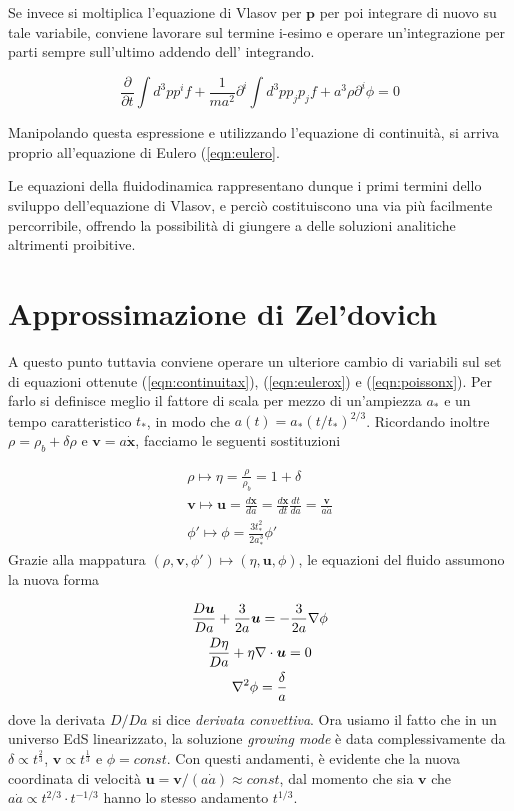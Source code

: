 Se invece si moltiplica l'equazione di Vlasov per $\bm{p}$ per poi integrare di nuovo su tale variabile, 
conviene lavorare sul termine i-esimo e operare un'integrazione per parti sempre sull'ultimo addendo dell'
integrando.

\begin{equation}
    \frac{\partial }{\partial t} \int d^3 p p^i f + \frac{1}{ma^2} \partial^i \int d^3 p p_j p_j f + a^3 \rho \partial^i \phi = 0 
\end{equation}

Manipolando questa espressione e utilizzando l'equazione di continuità, si arriva proprio all'equazione di Eulero
(\ref{eqn:eulero}.

Le equazioni della fluidodinamica rappresentano dunque i primi termini dello sviluppo dell'equazione di Vlasov,
e perciò costituiscono una via più facilmente percorribile, offrendo la possibilità di giungere a delle soluzioni
analitiche altrimenti proibitive.


\section{Approssimazione di Zel'dovich}

A questo punto tuttavia conviene operare un ulteriore cambio di variabili sul set di equazioni ottenute (\ref{eqn:continuitax}),
(\ref{eqn:eulerox}) e (\ref{eqn:poissonx}). Per farlo si definisce meglio il fattore di scala per mezzo di un'ampiezza $a_{*}$ e
un tempo caratteristico $t_{*}$, in modo che $a(t) = a_{*}(t / t_{*})^{2/3}$. Ricordando inoltre $\rho = \rho_b + \delta\rho$ e 
$\bm{v} = a \dot{\bm{x}}$, facciamo le seguenti sostituzioni

\begin{gather}
    \rho \mapsto \eta = \frac{\rho}{\rho_b} = 1 + \delta \\
    \bm{v} \mapsto \bm{u} = \frac{d\bm{x}}{da} = \frac{d\bm{x}}{dt}\frac{dt}{da} = \frac{\bm{v}}{a\dot{a}} \\
    \phi{'} \mapsto \phi = \frac{3t_{*}^2}{2a_{*}^3}\phi{'}
\end{gather}
Grazie alla mappatura $(\rho, \bm{v}, \phi{'})\mapsto(\eta, \bm{u}, \phi)$, le equazioni del fluido assumono
la nuova forma 

\begin{gather}
    \label{eqn:cont_tau}
    \frac{D\bm{u}}{Da} + \frac{3}{2a}\bm{u} = -\frac{3}{2a}\nabla\phi \\
    \frac{D\eta}{Da} + \eta \nabla \cdot \bm{u} = 0 \\
    \label{eqn:poisson_tau}
    \laplacian \phi = \frac{\delta}{a}
\end{gather}
dove la derivata $D/Da$ si dice \textit{derivata convettiva}.
Ora usiamo il fatto che in un universo EdS linearizzato, la soluzione \textit{growing mode} è data complessivamente
da  $\delta \propto t^{\frac{2}{3}}$, $\bm{v} \propto t^{\frac{1}{3}}$ e $\phi = const$. Con questi andamenti, è
evidente che la nuova coordinata di velocità $\bm{u} = \bm{v} / (a\dot{a}) \approx const$, dal momento che sia 
$\bm{v}$ che $a\dot{a} \propto t^{2/3} \cdot t^{-1/3}$ hanno lo stesso andamento $t^{1/3}$.

